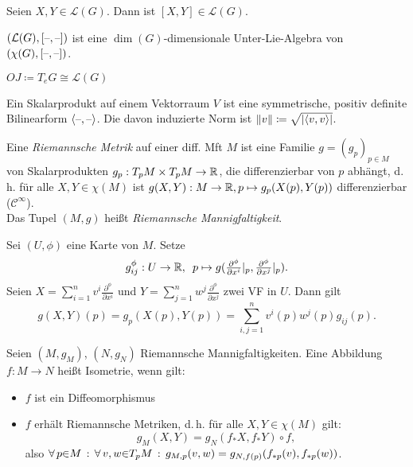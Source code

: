 \documentclass{cheat-sheet}
\newcommand{\coord}[1]{\tfrac{\partial^\phi}{\partial x^{#1}}} %
\begin{document}
\begin{lem}
  Seien $X, Y \in \mathcal{L}(G)$. Dann ist $[X, Y] \in \mathcal{L}(G)$.
\end{lem}

\begin{kor}
  $(\mathcal{L}(G), [\text{--},\text{--}])$ ist eine $\dim(G)$-dimensionale Unter-Lie-Algebra von $(\chi(G), [\text{--},\text{--}])$.
\end{kor}

\begin{nota}
  $OJ \coloneqq T_e G \cong \mathcal{L}(G)$
\end{nota}


\begin{defn}
  Ein Skalarprodukt auf einem Vektorraum $V$ ist eine symmetrische, positiv definite Bilinearform $\langle \text{--}, \text{--} \rangle$. Die davon induzierte Norm ist $\lVert v\rVert \coloneqq \sqrt{\lvert\langle v, v \rangle\rvert}$.
\end{defn}

\begin{defn}
  Eine \emph{Riemannsche Metrik} auf einer diff. Mft $M$ ist eine Familie $g = (g_p)_{p \in M}$ von Skalarprodukten $g_p : T_p M \times T_p M \to \mathbb{R}$, die differenzierbar von $p$ abhängt, d.\,h. für alle $X, Y \in \chi(M)$ ist $g(X, Y) : M \to \mathbb{R}, p \mapsto g_p(X(p), Y(p))$ differenzierbar ($\mathcal{C}^\infty$).\\
  Das Tupel $(M, g)$ heißt \emph{Riemannsche Mannigfaltigkeit}.
\end{defn}

\begin{bem}
  Sei $(U, \phi)$ eine Karte von $M$. Setze
  \[
    g_{ij}^{\phi} : U \to \R, \enspace
    p \mapsto g(\coord{i}|_p, \coord{j}|_p).
  \]
  Seien $X = \sum_{i=1}^n v^i \coord{i}$ und $Y = \sum_{j=1}^n w^j \coord{j}$ zwei VF in $U$. Dann gilt
  \[
    g(X, Y)(p) = g_p(X(p), Y(p)) = \sum_{i,j=1}^n v^i(p) w^j(p) g_{ij}(p).
  \]
\end{bem}

\begin{defn}
  Seien $(M, g_M)$, $(N, g_N)$ Riemannsche Mannigfaltigkeiten. Eine Abbildung $f : M \to N$ heißt Isometrie, wenn gilt:
  \begin{itemize}
    \item $f$ ist ein Diffeomorphismus
    \item $f$ erhält Riemannsche Metriken, d.\,h. für alle $X, Y \in \chi(M)$ gilt:
    \[ g_M(X, Y) = g_N(f_* X, f_* Y) \circ f, \]
    also $\forall \, {p {\in} M} \,:\, \forall \, {v, w {\in} T_p M} \,:\, g_{M,p} (v, w) = g_{N,f(p)}(f_{*p}(v), f_{*p}(w))$.
  \end{itemize}
\end{defn}
\end{document}
